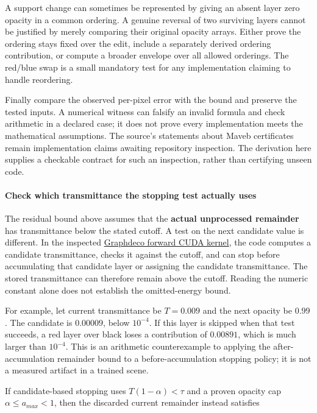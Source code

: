 A support change can sometimes be represented by giving an absent layer zero opacity in a common ordering. A genuine reversal of two surviving layers cannot be justified by merely comparing their original opacity arrays. Either prove the ordering stays fixed over the edit, include a separately derived ordering contribution, or compute a broader envelope over all allowed orderings. The red/blue swap is a small mandatory test for any implementation claiming to handle reordering.

Finally compare the observed per-pixel error with the bound and preserve the tested inputs. A numerical witness can falsify an invalid formula and check arithmetic in a declared case; it does not prove every implementation meets the mathematical assumptions. The source's statements about Maveb certificates remain implementation claims awaiting repository inspection. The derivation here supplies a checkable contract for such an inspection, rather than certifying unseen code.

\paragraph{Check which transmittance the stopping test actually uses}\label{check-which-transmittance-the-stopping-test-actually-uses}

The residual bound above assumes that the \textbf{actual unprocessed remainder} has transmittance below the stated cutoff. A test on the next candidate value is different. In the inspected \href{https://github.com/graphdeco-inria/diff-gaussian-rasterization/blob/main/cuda_rasterizer/forward.cu}{Graphdeco forward CUDA kernel}, the code computes a candidate transmittance, checks it against the cutoff, and can stop before accumulating that candidate layer or assigning the candidate transmittance. The stored transmittance can therefore remain above the cutoff. Reading the numeric constant alone does not establish the omitted-energy bound.

For example, let current transmittance be \(T=0.009\) and the next opacity be \(0.99\). The candidate is \(0.00009\), below \(10^{-4}\). If this layer is skipped when that test succeeds, a red layer over black loses a contribution of \(0.00891\), which is much larger than \(10^{-4}\). This is an arithmetic counterexample to applying the after-accumulation remainder bound to a before-accumulation stopping policy; it is not a measured artifact in a trained scene.

If candidate-based stopping uses \(T(1-\alpha)<\tau\) and a proven opacity cap \(\alpha\le a_{max}<1\), then the discarded current remainder instead satisfies

